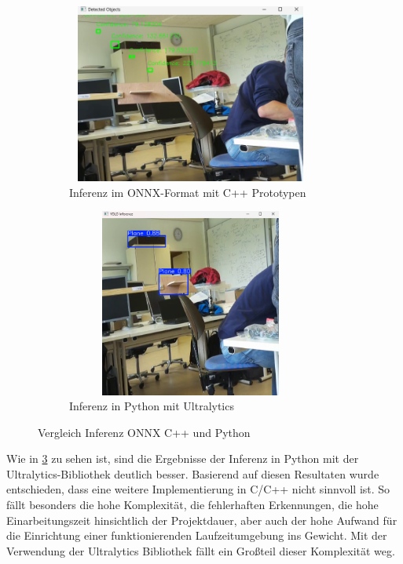 \begin{figure}[h]
  \centering
  \begin{subfigure}[b]{0.48\textwidth}
    \centering
    \includegraphics[width=0.9\textwidth,height=5.9cm,keepaspectratio]{images/ONNX_Inferenz.png}
    \caption{Inferenz im ONNX-Format mit C++ Prototypen}
    \label{fig:Screenshot: Inferenz im ONNX-Format mit C++ Prototypen}
  \end{subfigure}
  \hfill
  \begin{subfigure}[b]{0.48\textwidth}
    \centering
    \includegraphics[width=0.9\textwidth,height=6.2cm,keepaspectratio]{images/Python_Inferenz.png}
    \caption{Inferenz in Python mit Ultralytics}
    \label{fig:Screenshot: Inferenz Python mit Ultralytics}
  \end{subfigure}
  \caption{Vergleich Inferenz ONNX C++ und Python}
  \label{tab:Vergleich Inferenz ONNX C++ und Python}
\end{figure}

Wie in \ref{tab:Vergleich Inferenz ONNX C++ und Python} zu sehen ist, sind die Ergebnisse der Inferenz in Python mit der Ultralytics-Bibliothek deutlich besser.
Basierend auf diesen Resultaten wurde entschieden, dass eine weitere Implementierung in C/C++ nicht sinnvoll ist. So fällt besonders die hohe Komplexität, die fehlerhaften Erkennungen, die hohe Einarbeitungszeit hinsichtlich der Projektdauer, aber auch der hohe Aufwand für die Einrichtung einer funktionierenden Laufzeitumgebung ins Gewicht. Mit der Verwendung der Ultralytics Bibliothek fällt ein Großteil dieser Komplexität weg. 

